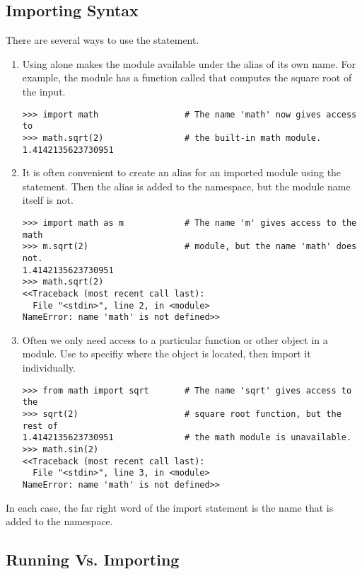 \subsection*{Importing Syntax}
There are several ways to use the  statement.
\begin{enumerate}

\item Using  alone makes the module available under the alias of its own name. For example, the  module has a function called  that computes the square root of the input.
\begin{lstlisting}
>>> import math                 # The name 'math' now gives access to
>>> math.sqrt(2)                # the built-in math module.
1.4142135623730951
\end{lstlisting}

\item It is often convenient to create an alias for an imported module using the  statement. Then the alias is added to the namespace, but the module name itself is not.
\begin{lstlisting}
>>> import math as m            # The name 'm' gives access to the math
>>> m.sqrt(2)                   # module, but the name 'math' does not.
1.4142135623730951
>>> math.sqrt(2)
<<Traceback (most recent call last):
  File "<stdin>", line 2, in <module>
NameError: name 'math' is not defined>>
\end{lstlisting}

\item Often we only need access to a particular function or other object in a module.
Use  to specifiy where the object is located, then import it individually.
\begin{lstlisting}
>>> from math import sqrt       # The name 'sqrt' gives access to the
>>> sqrt(2)                     # square root function, but the rest of
1.4142135623730951              # the math module is unavailable.
>>> math.sin(2)
<<Traceback (most recent call last):
  File "<stdin>", line 3, in <module>
NameError: name 'math' is not defined>>
\end{lstlisting}
\end{enumerate}

In each case, the far right word of the import statement is the name that is added to the namespace.

\subsection*{Running Vs. Importing}

